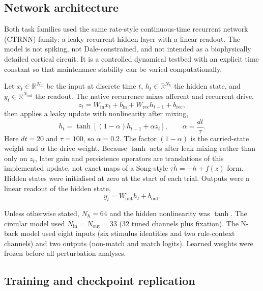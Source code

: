 \subsection{Network architecture}

Both task families used the same rate-style continuous-time recurrent network
(CTRNN) family: a leaky recurrent hidden layer with a linear readout. The
model is not spiking, not Dale-constrained, and not intended as a
biophysically detailed cortical circuit. It is a controlled dynamical testbed
with an explicit time constant so that maintenance stability can be varied
computationally.

Let $x_t\in\mathbb{R}^{N_{\mathrm{in}}}$ be the input at discrete time $t$,
$h_t\in\mathbb{R}^{N_h}$ the hidden state, and $y_t\in\mathbb{R}^{N_{\mathrm{out}}}$
the readout. The native recurrence mixes afferent and recurrent drive,
\begin{equation}
 z_t = W_{\mathrm{in}}x_t+b_{\mathrm{in}}
      +W_{\mathrm{rec}}h_{t-1}+b_{\mathrm{rec}},
 \label{eq:drive}
\end{equation}
then applies a leaky update with nonlinearity after mixing,
\begin{equation}
 h_t = \tanh\!\left[(1-\alpha)h_{t-1}+\alpha z_t\right],
 \qquad \alpha=\frac{dt}{\tau}.
 \label{eq:native}
\end{equation}
Here $dt=20$ and $\tau=100$, so $\alpha=0.2$. The factor $(1-\alpha)$ is the
carried-state weight and $\alpha$ the drive weight. Because $\tanh$ acts after
leak mixing rather than only on $z_t$, later gain and persistence operators are
translations of this implemented update, not exact maps of a Song-style
$\tau\dot h=-h+f(z)$ form. Hidden states were initialised at zero at the start
of each trial. Outputs were a linear readout of the hidden state,
\begin{equation}
 y_t = W_{\mathrm{out}}h_t+b_{\mathrm{out}}.
 \label{eq:readout}
\end{equation}

Unless otherwise stated, $N_h=64$ and the hidden nonlinearity was $\tanh$.
The circular model used $N_{\mathrm{in}}=N_{\mathrm{out}}=33$ (32 tuned
channels plus fixation). The N-back model used eight inputs (six stimulus
identities and two rule-context channels) and two outputs (non-match and match
logits). Learned weights were frozen before all perturbation analyses.

\subsection{Training and checkpoint replication}

